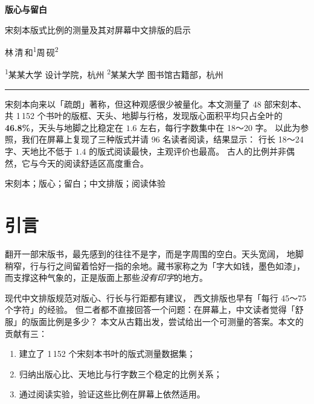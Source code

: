\documentclass[UTF8,zihao=-4]{ctexart}
\begin{document}
\thispagestyle{empty}
\begin{center}
  {\bfseries 版心与留白\par}
  \vspace{6pt}
  {宋刻本版式比例的测量及其对屏幕中文排版的启示\par}
  \vspace{14pt}
  {\kaishu 林\,清\,和\textsuperscript{1}\qquad 周\,砚\textsuperscript{2}\par}
  \vspace{4pt}
  {\small\color{mist}
    \textsuperscript{1}某某大学 设计学院，杭州\qquad
    \textsuperscript{2}某某大学 图书馆古籍部，杭州\par}
  \vspace{12pt}
  {\color{accent}\rule{2.5cm}{.6pt}}
\end{center}

\begin{center}
  \begin{minipage}{.9\linewidth}
    \small
    \quad
    宋刻本向来以「疏朗」著称，但这种观感很少被量化。本文测量了 48 部宋刻本、
    共 1\,152 个书叶的版框、天头、地脚与行格，发现版心面积平均只占全叶的
    \textbf{46.8\%}，天头与地脚之比稳定在 $1.6$ 左右，每行字数集中在 18～20 字。
    以此为参照，我们在屏幕上复现了三种版式并请 96 名读者阅读，结果显示：
    行长 18～24 字、天地比不低于 $1.4$ 的版式阅读最快，主观评价也最高。
    古人的比例并非偶然，它与今天的阅读舒适区高度重合。

    \vspace{4pt}
    \quad 宋刻本；版心；留白；中文排版；阅读体验
  \end{minipage}
\end{center}
\vspace{8pt}

\section{引言}

翻开一部宋版书，最先感到的往往不是字，而是字周围的空白。天头宽阔，
地脚稍窄，行与行之间留着恰好一指的余地。藏书家称之为「字大如钱，墨色如漆」，
而支撑这种气象的，正是版面上那些\emph{没有印字}的地方。

现代中文排版规范对版心、行长与行距都有建议\cite{w3c2020clreq}，
西文排版也早有「每行 45～75 个字符」的经验\cite{bringhurst2004}。
但二者都不直接回答一个问题：在屏幕上，中文读者觉得「舒服」的版面比例是多少？
本文从古籍出发，尝试给出一个可测量的答案。本文的贡献有三：
\begin{enumerate}
  \item 建立了 1\,152 个宋刻本书叶的版式测量数据集；
  \item 归纳出版心比、天地比与行字数三个稳定的比例关系；
  \item 通过阅读实验，验证这些比例在屏幕上依然适用。
\end{enumerate}
\end{document}
